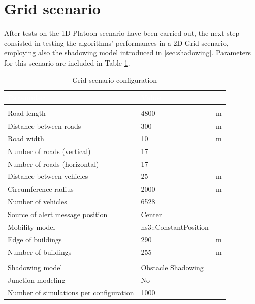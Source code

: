 		
	\section{Grid scenario}
		\label{sec:grid}
		After tests on the 1D Platoon scenario have been carried out, the next step consisted in testing the algorithms' performances in a 2D Grid scenario, employing also the shadowing model introduced in \ref{sec:shadowing}.
		Parameters for this scenario are included in Table \ref{tab:grid}.  
		
		\begin{table}[H]
			\def\arraystretch{1.1}
			\begin{tabularx}{\textwidth}{l | l  l}
				\rowcolor{I} {\large \textcolor{white}{Parameter}} & {\large \textcolor{white}{Value}} & {\large \textcolor{white}{}} \TBstrut  \\
				\toprule
				\endhead
				\rowcolor{P} \multicolumn{3}{c}{Scenario configuration} \\
				\midrule[1pt]
				Road length 							& 4800	 				& m		\\
				Distance between roads					& 300					& m		\\
				Road width								& 10					& m		\\
				Number of roads (vertical)				& 17					&		\\
				Number of roads (horizontal)			& 17					&		\\
				Distance between vehicles 				& 25					& m		\\
				Circumference radius					& 2000					& m		\\
				Number of vehicles						& 6528					& 		\\
				Source of alert message position		& Center				&		\\
				Mobility model							& ns3::ConstantPosition	&		\\
				Edge of buildings						& 290					& m		\\
				Number of buildings						& 255					& m		\\
				\midrule[1pt]
				\rowcolor{P} \multicolumn{3}{c}{Network configuration} \\
				\midrule[1pt]
				Shadowing model							& Obstacle Shadowing	&		\\
				Junction modeling						& No					&		\\
				\midrule[1pt]
				Number of simulations per configuration	& 1000					&		\\
				\bottomrule
			\end{tabularx}
			\caption{Grid scenario configuration}
			\label{tab:grid}
		\end{table}
	
